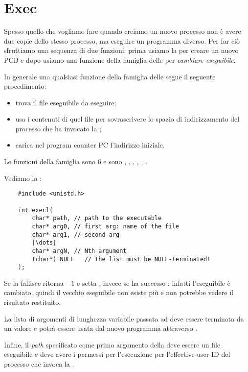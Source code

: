 \section{Exec}

Spesso quello che vogliamo fare quando creiamo un nuovo processo non è avere due copie dello stesso processo, ma eseguire un programma diverso. 
Per far ciò sfruttiamo una sequenza di due funzioni:
prima usiamo la  per creare un nuovo \textsf{PCB} e dopo usiamo una funzione della famiglia delle  per \emph{cambiare eseguibile}.

In generale una qualsiasi funzione della famiglia delle  segue il seguente procedimento:
\begin{itemize}
    \item trova il file eseguibile da eseguire;
    \item usa i contenuti di quel file per sovrascrivere lo spazio di indirizzamento del processo che ha invocato la ;
    \item carica nel program counter \textsf{PC} l'indirizzo iniziale.
\end{itemize}

Le funzioni della famiglia  sono $6$ e sono , , , , , .

Vediamo la :
\begin{verbatim}
    #include <unistd.h>

    int execl(
        char* path, // path to the executable
        char* arg0, // first arg: name of the file
        char* arg1, // second arg
        |\dots|
        char* argN, // Nth argument
        (char*) NULL   // the list must be NULL-terminated! 
    );
\end{verbatim}

Se la  fallisce ritorna $-1$ e setta , invece se ha successo : infatti l'eseguibile è cambiato, quindi il vecchio eseguibile non esiste più e non potrebbe vedere il risultato restituito.

La lista di argomenti di lunghezza variabile passata ad  deve essere terminata da un valore  e potrà essere usata dal nuovo programma attraverso .

Infine, il \emph{path} specificato come primo argomento della  deve essere un file eseguibile e deve avere i permessi per l'esecuzione per l'effective-user-ID del processo che invoca la .

